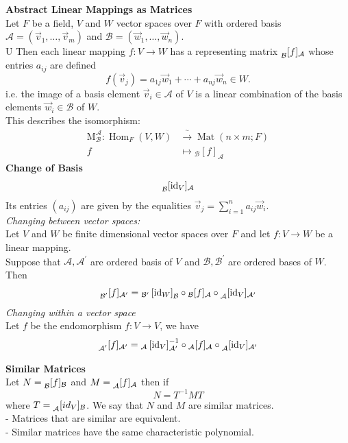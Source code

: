 \documentclass[a4paper, 10pt]{article}
\begin{document}
\begin{multicols*}{3}
\textbf{Abstract Linear Mappings as Matrices}\\
Let $F$ be a field, $V$ and $W$ vector spaces over $F$ with ordered basis $\mathcal{A}=\left(\vec{v}_1, \ldots, \vec{v}_m\right)$ and $\mathcal{B}=\left(\vec{w}_1, \ldots, \vec{w}_n\right)$. \\U
Then each linear mapping $f: V \rightarrow W$ has a representing matrix $\prescript{}{\mathcal{B}}{[f]}_{\mathcal{A}}$ whose entries $a_{i j}$ are defined
$$
f\left(\vec{v}_j\right)=a_{1 j} \vec{w}_1+\cdots+a_{n j} \vec{w}_n \in W .
$$
i.e. the image of a basis element $\vec{v}_i\in\mathcal{A}$ of $V$ is a linear combination of the basis elements $\vec{w}_i\in\mathcal{B}$ of $W$.\\
This describes the isomorphism:
\begin{align*}
\mathrm{M}_{\mathcal{B}}^{\mathcal{A}}: \operatorname{Hom}_F(V, W) & \xrightarrow{\overset{\sim}{}}  \operatorname{Mat}(n \times m ; F) \\
f & \mapsto{ }_{\mathcal{B}}[f]_{\mathcal{A}}
\end{align*}
\textbf{Change of Basis}
$$
\prescript{}{\mathcal{B}}{\left[\mathrm{id}_V\right]}_{\mathcal{A}}
$$
Its entries $(a_{ij})$ are given by the equalities $\vec{v}_j=\sum_{i=1}^n a_{i j} \vec{w}_i$.\\
\textit{Changing between vector spaces:}\\
Let $V$ and $W$ be finite dimensional vector spaces over $F$ and let $f: V \rightarrow W$ be a linear mapping. \\
Suppose that $\mathcal{A}, \mathcal{A}^{\prime}$ are ordered basis of $V$ and $\mathcal{B}, \mathcal{B}^{\prime}$ are ordered bases of $W$. Then
$$
\prescript{}{\mathcal{B}^{\prime}}[f]_{\mathcal{A}^{\prime}}={ }_{\mathcal{B}^{\prime}}\left[\mathrm{id}_W\right]_{\mathcal{B}} \circ{ }_{\mathcal{B}}[f]_{\mathcal{A}} \circ \prescript{}{\mathcal{A}}[\mathrm{id}_V]_{\mathcal{A}^{\prime}}
$$
\textit{Changing within a vector space}\\
Let $f$ be the endomorphism $f:V\rightarrow V$, we have
$$
\prescript{}{\mathcal{A}^{\prime}}[f]_{\mathcal{A}^{\prime}}={ }_{\mathcal{A}}\left[\mathrm{id}_V\right]_{\mathcal{A}^\prime}^{-1} \circ{ }_{\mathcal{A}}[f]_{\mathcal{A}} \circ \prescript{}{\mathcal{A}}[\mathrm{id}_V]_{\mathcal{A}^{\prime}}
$$

\textbf{Similar Matrices}\\
Let $N=\prescript{}{\mathcal{B}}[f]_\mathcal{B}$ and $M=\prescript{}{\mathcal{A}}[f]_\mathcal{A}$ then if 
$$N=T^{-1}MT$$
where $T=\prescript{}{\mathcal{A}}[id_V]_\mathcal{B}$.
We say that $N$ and $M$ are similar matrices.\\
- Matrices that are similar are equivalent. \\
- Similar matrices have the same characteristic polynomial. 


\end{multicols*}
\end{document}
